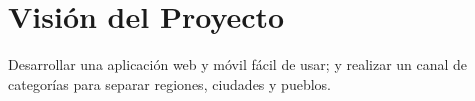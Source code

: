 \chapter{Visión del Proyecto}
Desarrollar una aplicación web y móvil fácil de usar; y realizar un canal de categorías para separar regiones, ciudades y pueblos.